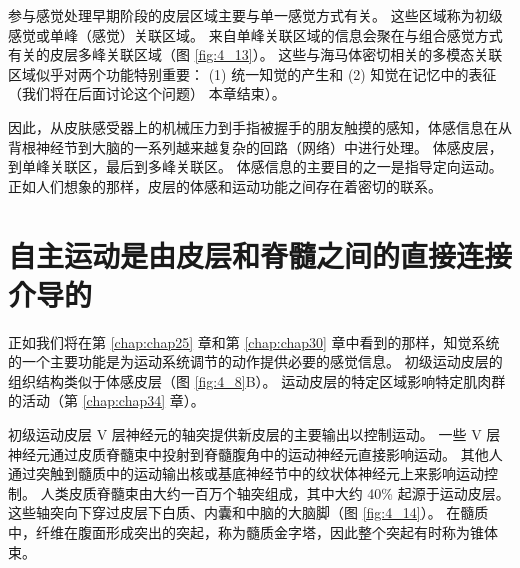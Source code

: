 参与感觉处理早期阶段的皮层区域主要与单一感觉方式有关。 这些区域称为初级感觉或单峰（感觉）关联区域。 
来自单峰关联区域的信息会聚在与组合感觉方式有关的皮层多峰关联区域（图 \ref{fig:4_13}）。 
这些与海马体密切相关的多模态关联区域似乎对两个功能特别重要：
(1) 统一知觉的产生和 
(2) 知觉在记忆中的表征（我们将在后面讨论这个问题） 本章结束）。


因此，从皮肤感受器上的机械压力到手指被握手的朋友触摸的感知，体感信息在从背根神经节到大脑的一系列越来越复杂的回路（网络）中进行处理。 
体感皮层，到单峰关联区，最后到多峰关联区。 
体感信息的主要目的之一是指导定向运动。 
正如人们想象的那样，皮层的体感和运动功能之间存在着密切的联系。

\section{自主运动是由皮层和脊髓之间的直接连接介导的}

正如我们将在第 \ref{chap:chap25} 章和第 \ref{chap:chap30} 章中看到的那样，知觉系统的一个主要功能是为运动系统调节的动作提供必要的感觉信息。 
初级运动皮层的组织结构类似于体感皮层（图 \ref{fig:4_8}B）。 
运动皮层的特定区域影响特定肌肉群的活动（第 \ref{chap:chap34} 章）。


初级运动皮层 V 层神经元的轴突提供新皮层的主要输出以控制运动。 
一些 V 层神经元通过皮质脊髓束中投射到脊髓腹角中的运动神经元直接影响运动。 
其他人通过突触到髓质中的运动输出核或基底神经节中的纹状体神经元上来影响运动控制。 
人类皮质脊髓束由大约一百万个轴突组成，其中大约 40\% 起源于运动皮层。 
这些轴突向下穿过皮层下白质、内囊和中脑的大脑脚（图 \ref{fig:4_14}）。 
在髓质中，纤维在腹面形成突出的突起，称为髓质金字塔，因此整个突起有时称为锥体束。

